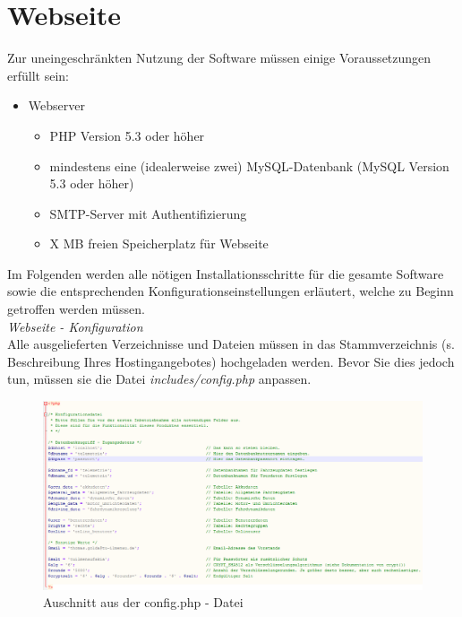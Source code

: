 \documentclass[fontsize = 12pt, paper = a4]{scrreprt}
\begin{document}
\newpage


\section{Webseite}

Zur uneingeschränkten Nutzung der Software müssen einige Voraussetzungen erfüllt sein: 

\begin{itemize}

\item Webserver 

\begin{itemize}

\item PHP Version 5.3 oder höher
\item mindestens eine (idealerweise zwei) MySQL-Datenbank (MySQL Version 5.3 oder höher)
\item SMTP-Server mit Authentifizierung
\item X MB freien Speicherplatz für Webseite

\end{itemize}

\end{itemize}

Im Folgenden werden alle nötigen Installationsschritte für die gesamte Software sowie die entsprechenden Konfigurationseinstellungen erläutert, welche zu Beginn getroffen werden müssen. \\

\textit{Webseite - Konfiguration} \\

Alle ausgelieferten Verzeichnisse und Dateien müssen in das Stammverzeichnis (s. Beschreibung Ihres Hostingangebotes) hochgeladen werden. Bevor Sie dies jedoch tun, müssen sie die Datei \textit{includes/config.php} anpassen. \\ 

\begin{figure}[h]
\centering
\includegraphics[scale = 0.50]{website_config}
\caption[Auschnitt aus der config.php - Datei]{Auschnitt aus der config.php - Datei}
\label{websiteconfig}
\end{figure} 
\end{document}
